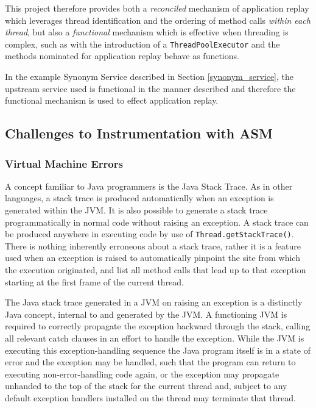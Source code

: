 \documentclass[]{final_report}
\begin{document}
This project therefore provides both a \textit{reconciled} mechanism of application replay which leverages thread identification and the ordering of method calls \textit{within each thread}, but also a \textit{functional} mechanism which is effective when threading is complex, such as with the introduction of a \lstinline{ThreadPoolExecutor}\noop{} and the methods nominated for application replay behave as functions.

In the example Synonym Service described in Section \ref{synonym_service}, the upstream service used is functional in the manner described and therefore the functional mechanism is used to effect application replay.

\subsection{Challenges to Instrumentation with ASM}
\subsubsection{Virtual Machine Errors}

A concept familiar to Java programmers is the Java Stack Trace. As in other languages, a stack trace is produced automatically when an exception is generated within the JVM. It is also possible to generate a stack trace programmatically in normal code without raising an exception. A stack trace can be produced anywhere in executing code by use of \linebreak[4] \lstinline{Thread.getStackTrace()}.\noop{} There is nothing inherently erroneous about a stack trace, rather it is a feature used when an exception is raised to automatically pinpoint the site from which the execution originated, and list all method calls that lead up to that exception starting at the first frame of the current thread.

The Java stack trace generated in a JVM on raising an exception is a distinctly Java concept, internal to and generated by the JVM. A functioning JVM is required to correctly propagate the exception backward through the stack, calling all relevant catch clauses in an effort to handle the exception. While the JVM is executing this exception-handling sequence the Java program itself is in a state of error and the exception may be handled, such that the program can return to executing non-error-handling code again, or the exception may propagate unhanded to the top of the stack for the current thread and, subject to any default exception handlers installed on the thread may terminate that thread.
\end{document}

